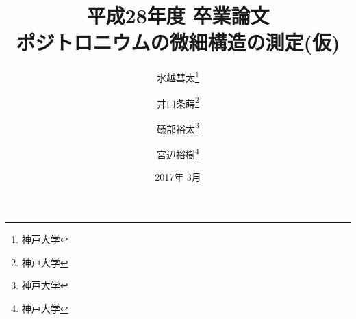 \documentclass[uplatex,report]{jsbook}
\begin{document}
\title{平成28年度 卒業論文\\
ポジトロニウムの微細構造の測定(仮)}
\author{水越彗太\thanks{神戸大学}\and 井口条蒔\thanks{神戸大学}\and 礒部裕太\thanks{神戸大学}\and 宮辺裕樹\thanks{神戸大学}}
\date{2017年 3月}

\maketitle



\tableofcontents
\listoffigures
\listoftables









\appendix




\end{document}
